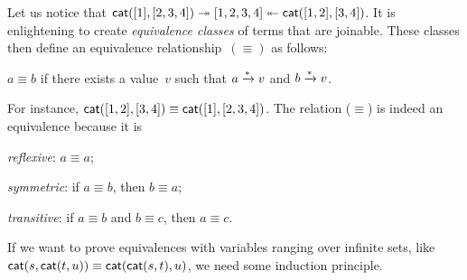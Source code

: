 Let us notice that \(\textsf{cat}([1], [2,3,4]) \twoheadrightarrow
[1,2,3,4] \twoheadleftarrow \textsf{cat}([1,2],
[3,4])\). It is enlightening to create
\emph{equivalence classes} of terms that are joinable. These classes
then define an equivalence relationship~\((\equiv)\)
 as follows:
\begin{center}
  \(a \equiv b\) if there exists a value~\(v\) such that \(a
  \xrightarrow{\smash[t]{*}} v\) and \(b \xrightarrow{\smash{*}} v\).
\end{center}
For instance, \(\textsf{cat}([1,2], [3,4]) \equiv \textsf{cat}([1],
[2,3,4])\). The relation (\(\equiv\)) is indeed an equivalence
because it is
\begin{itemize*}

  \item \emph{reflexive}: \(a \equiv a\);

  \item \emph{symmetric}: if \(a \equiv b\), then \(b \equiv a\);

  \item \emph{transitive}: if \(a \equiv b\) and \(b \equiv c\), then
    \(a \equiv c\).

\end{itemize*}

If we want to prove equivalences with variables ranging over
infinite sets, like \(\textsf{cat}(s,\textsf{cat}(t,u)) \equiv
\textsf{cat}(\textsf{cat}(s,t),u)\), we need some
induction principle.


\label{par:well-founded}

